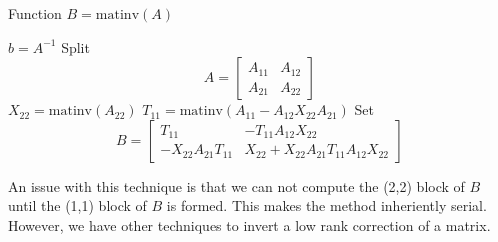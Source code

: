 \begin{algorithm}
    \caption{Function $B=\text{matinv}(A)$}
    \begin{algorithmic}
            \STATE $b = A^{-1}$
        \ELSE
            \STATE Split \begin{equation*}
                A = \begin{bmatrix}
                    A_{11} & A_{12}\\
                    A_{21} & A_{22}
            \end{bmatrix}
        \end{equation*}
            \STATE $X_{22} = \text{matinv}(A_{22})$
            \STATE $T_{11} = \text{matinv}(A_{11}-A_{12}X_{22}A_{21})$
            \STATE Set \begin{equation*}
            B = \begin{bmatrix}
                T_{11} & -T_{11}A_{12}X_{22}\\
                -X_{22}A_{21}T_{11} &
                X_{22} + X_{22}A_{21}T_{11}A_{12}X_{22}
            \end{bmatrix}
        \end{equation*}
        \ENDIF
    \end{algorithmic}
\end{algorithm}


An issue with this technique is that we can not compute the (2,2) block of $B$ until the (1,1) block of $B$ is formed. This makes the method inheriently serial. However, we have other techniques to invert a low rank correction of a matrix.

